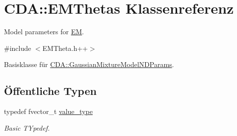 \hypertarget{classCDA_1_1EMThetas}{
\section{CDA::EMThetas Klassenreferenz}
\label{classCDA_1_1EMThetas}
}


Model parameters for \hyperlink{classCDA_1_1EM}{EM}.  




{\ttfamily \#include $<$EMTheta.h++$>$}



Basisklasse für \hyperlink{classCDA_1_1GaussianMixtureModelNDParams}{CDA::GaussianMixtureModelNDParams}.

\subsection*{Öffentliche Typen}
\begin{DoxyCompactItemize}
\item 
\hypertarget{classCDA_1_1EMThetas_aba47b3e7d71ea344695798e68471cc69}{
typedef fvector\_\-t \hyperlink{classCDA_1_1EMThetas_aba47b3e7d71ea344695798e68471cc69}{value\_\-type}}
\label{classCDA_1_1EMThetas_aba47b3e7d71ea344695798e68471cc69}

\begin{DoxyCompactList}\small\item\em Basic TYpedef. \item\end{DoxyCompactList}\end{DoxyCompactItemize}
